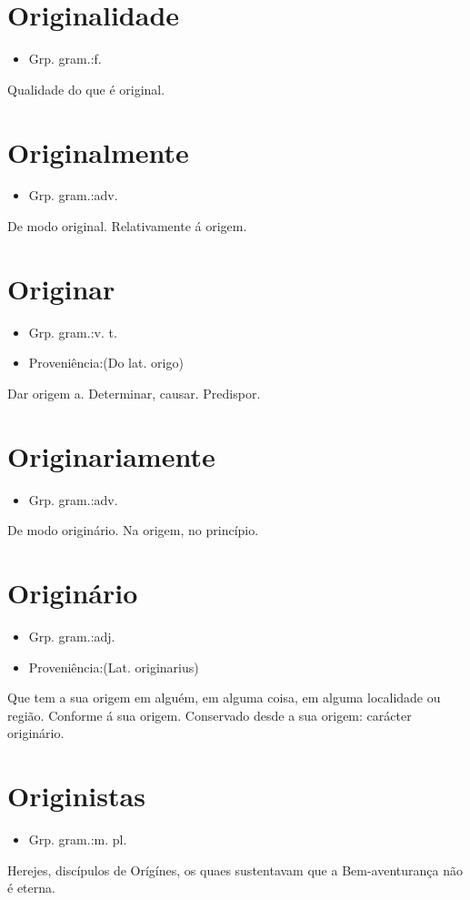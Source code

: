 \section{Originalidade}
\begin{itemize}
\item {Grp. gram.:f.}
\end{itemize}
Qualidade do que é original.
\section{Originalmente}
\begin{itemize}
\item {Grp. gram.:adv.}
\end{itemize}
De modo original.
Relativamente á origem.
\section{Originar}
\begin{itemize}
\item {Grp. gram.:v. t.}
\end{itemize}
\begin{itemize}
\item {Proveniência:(Do lat. \textunderscore origo\textunderscore )}
\end{itemize}
Dar origem a.
Determinar, causar.
Predispor.
\section{Originariamente}
\begin{itemize}
\item {Grp. gram.:adv.}
\end{itemize}
De modo originário.
Na origem, no princípio.
\section{Originário}
\begin{itemize}
\item {Grp. gram.:adj.}
\end{itemize}
\begin{itemize}
\item {Proveniência:(Lat. \textunderscore originarius\textunderscore )}
\end{itemize}
Que tem a sua origem em alguém, em alguma coisa, em alguma localidade ou região.
Conforme á sua origem.
Conservado desde a sua origem: \textunderscore carácter originário\textunderscore .
\section{Originistas}
\begin{itemize}
\item {Grp. gram.:m. pl.}
\end{itemize}
Herejes, discípulos de Orígínes, os quaes sustentavam que a Bem-aventurança não é eterna.
